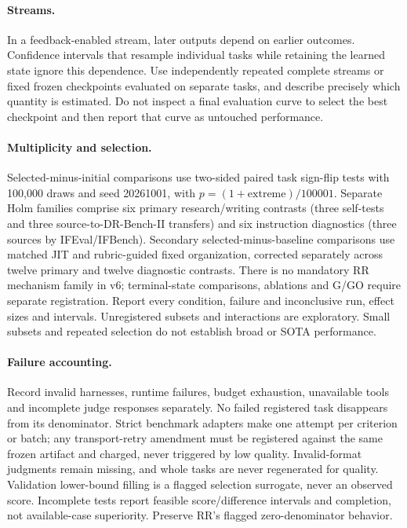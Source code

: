 \paragraph{Streams.}
In a feedback-enabled stream, later outputs depend on earlier outcomes. Confidence intervals that resample individual tasks while retaining the learned state ignore this dependence. Use independently repeated complete streams or fixed frozen checkpoints evaluated on separate tasks, and describe precisely which quantity is estimated. Do not inspect a final evaluation curve to select the best checkpoint and then report that curve as untouched performance.

\paragraph{Multiplicity and selection.}
Selected-minus-initial comparisons use two-sided paired task sign-flip tests with 100,000 draws and seed 20261001, with $p=(1+\text{extreme})/100001$. Separate Holm families comprise six primary research/writing contrasts (three self-tests and three source-to-DR-Bench-II transfers) and six instruction diagnostics (three sources by IFEval/IFBench). Secondary selected-minus-baseline comparisons use matched JIT and rubric-guided fixed organization, corrected separately across twelve primary and twelve diagnostic contrasts. There is no mandatory RR mechanism family in v6; terminal-state comparisons, ablations and G/GO require separate registration. Report every condition, failure and inconclusive run, effect sizes and intervals. Unregistered subsets and interactions are exploratory. Small subsets and repeated selection do not establish broad or SOTA performance.

\paragraph{Failure accounting.}
Record invalid harnesses, runtime failures, budget exhaustion, unavailable tools and incomplete judge responses separately. No failed registered task disappears from its denominator. Strict benchmark adapters make one attempt per criterion or batch; any transport-retry amendment must be registered against the same frozen artifact and charged, never triggered by low quality. Invalid-format judgments remain missing, and whole tasks are never regenerated for quality. Validation lower-bound filling is a flagged selection surrogate, never an observed score. Incomplete tests report feasible score/difference intervals and completion, not available-case superiority. Preserve RR's flagged zero-denominator behavior.

